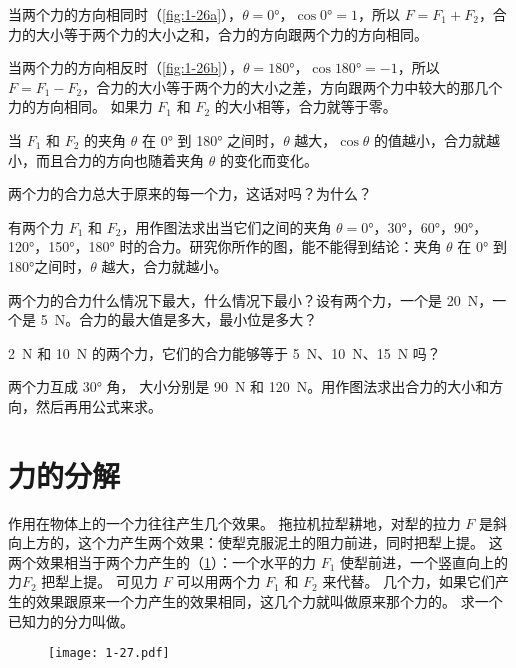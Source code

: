 当两个力的方向相同时（\cref{fig:1-26a}），$\theta =\ang{0}$，$\cos\ang{0}=1$，所以 $F=F_1+F_2$，合力的大小等于两个力的大小之和，合力的方向跟两个力的方向相同。

当两个力的方向相反时（\cref{fig:1-26b}），$\theta =\ang{180}$，$\cos\ang{180}=-1$，所以 $F=F_1-F_2$，合力的大小等于两个力的大小之差，方向跟两个力中较大的那几个力的方向相同。
如果力 $F_1$ 和 $F_2$ 的大小相等，合力就等于零。

当 $F_1$ 和 $F_2$ 的夹角 $\theta$ 在 \ang{0} 到 \ang{180} 之间时，$\theta$ 越大，$\cos\theta$ 的值越小，合力就越小，而且合力的方向也随着夹角 $\theta$ 的变化而变化。

\begin{Practice}
\begin{question}
\item 两个力的合力总大于原来的每一个力，这话对吗？为什么？

\item 有两个力 $F_1$ 和 $F_2$，用作图法求出当它们之间的夹角 $\theta =\ang{0}$，\ang{30}，\ang{60}，\ang{90}，\ang{120}，\ang{150}，\ang{180} 时的合力。研究你所作的图，能不能得到结论：夹角 $\theta$ 在 \ang{0} 到 \ang{180}之间时，$\theta$ 越大，合力就越小。
\item 两个力的合力什么情况下最大，什么情况下最小？设有两个力，一个是 \qty{20}{N}，一个是 \qty{5}{N}。合力的最大值是多大，最小位是多大？
\item \qty{2}{N} 和 \qty{10}{N} 的两个力，它们的合力能够等于 \qty{5}{N}、\qty{10}{N}、\qty{15}{N} 吗？
\item  两个力互成 \ang{30} 角， 大小分别是 \qty{90}{N} 和 \qty{120}{N}。用作图法求出合力的大小和方向，然后再用公式来求。
\end{question}
\end{Practice}
    
\section{力的分解}
作用在物体上的一个力往往产生几个效果。
拖拉机拉犁耕地，对犁的拉力 $F$ 是斜向上方的，这个力产生两个效果：使犁克服泥土的阻力前进，同时把犁上提。
这两个效果相当于两个力产生的（\cref{fig:1-27}）：一个水平的力 $F_1$ 使犁前进，一个竖直向上的力$F_2$ 把犁上提。
可见力 $F$ 可以用两个力 $F_1$ 和 $F_2$ 来代替。
几个力，如果它们产生的效果跟原来一个力产生的效果相同，这几个力就叫做原来那个力的。
求一个已知力的分力叫做。

\begin{figure}
  \texttt{[image: 1-27.pdf]}
  \caption{}\label{fig:1-27}
\end{figure}

